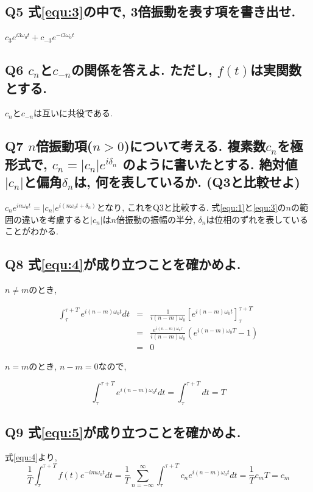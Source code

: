 \documentclass[titlepage]{jarticle}
\begin{document}
\subsection{Q5 式\ref{equ:3}の中で, 3倍振動を表す項を書き出せ.}
$c_3e^{i3\omega_0t}+c_{-3}e^{-i3\omega_0t}$

\subsection{Q6 $c_n$と$c_{-n}$の関係を答えよ. ただし, $f(t)$は実関数とする.}
$c_n$と$c_{-n}$は互いに共役である.

\subsection{Q7 $n$倍振動項($n>0$)について考える. 複素数$c_n$を極形式で,
$c_n=|c_n|e^{i\delta_n}$
のように書いたとする.
絶対値$|c_n|$と偏角$\delta_n$は, 何を表しているか. (Q3と比較せよ)}

$c_ne^{in\omega_0t}=|c_n|e^{i(n\omega_0t+\delta_n)}$となり,
これをQ3と比較する.
式\ref{equ:1}と\ref{equ:3}の$n$の範囲の違いを考慮すると$|c_n|$は$n$倍振動の振幅の半分,
$\delta_n$は位相のずれを表していることがわかる.

\subsection{Q8 式\ref{equ:4}が成り立つことを確かめよ.}
$n \neq m$のとき,

\begin{eqnarray}
  \int_\tau^{\tau+T}e^{i(n-m)\omega_0t}dt&=&\frac{1}{i(n-m)\omega_0}\left[e^{i(n-m)\omega_0t}\right]_\tau^{\tau+T}\nonumber\\
  &=&\frac{e^{i(n-m)\omega_0\tau}}{i(n-m)\omega_0}\left(e^{i(n-m)\omega_0T}-1\right)\nonumber\\
  &=&0\nonumber
\end{eqnarray}

$n=m$のとき, $n-m=0$なので,

\begin{equation*}
  \int_\tau^{\tau+T}e^{i(n-m)\omega_0t}dt=\int_\tau^{\tau+T}dt=T
\end{equation*}

\subsection{Q9 式\ref{equ:5}が成り立つことを確かめよ.}
式\ref{equ:4}より,
\begin{equation*}
  \frac{1}{T}\int_\tau^{\tau+T}f(t)e^{-im\omega_0t}dt
  = \frac{1}{T}\sum^\infty_{n=-\infty}\int^{\tau+T}_{\tau}c_ne^{i(n-m)\omega_0t}dt
  = \frac{1}{T}c_mT=c_m
\end{equation*}
\end{document}
